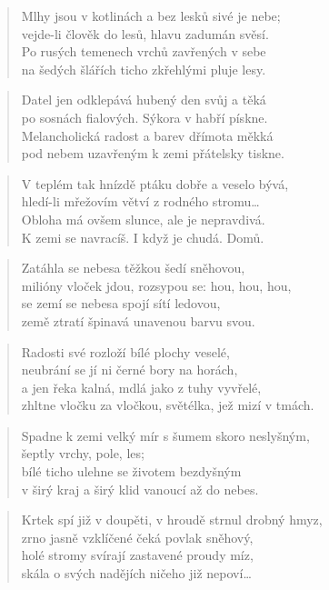 \documentclass{book}
\begin{document}
\newpage
{}
\begin{verse}
Mlhy jsou v kotlinách a bez lesků sivé je nebe;\\
vejde-li člověk do lesů, hlavu zadumán svěsí.\\
Po rusých temenech vrchů zavřených v sebe\\
na šedých šlářích ticho zkřehlými pluje lesy.
\end{verse}
\begin{verse}
Datel jen odklepává hubený den svůj a těká\\
po sosnách fialových. Sýkora v habří pískne.\\
Melancholická radost a barev dřímota měkká\\
pod nebem uzavřeným k zemi přátelsky tiskne.
\end{verse}
\begin{verse}
V teplém tak hnízdě ptáku dobře a veselo bývá,\\
hledí-li mřežovím větví z rodného stromu\ldots\\
Obloha má ovšem slunce, ale je nepravdivá.\\
K zemi se navracíš. I když je chudá. Domů.
\end{verse}
\newpage
{}
\begin{verse}
Zatáhla se nebesa těžkou šedí sněhovou,\\
milióny vloček jdou, rozsypou se: hou, hou, hou,\\
se zemí se nebesa spojí sítí ledovou,\\
země ztratí špinavá unavenou barvu svou.
\end{verse}
\begin{verse}
Radosti své rozloží bílé plochy veselé,\\
neubrání se jí ni černé bory na horách,\\
a jen řeka kalná, mdlá jako z tuhy vyvřelé,\\
zhltne vločku za vločkou, světélka, jež mizí v tmách.
\end{verse}
\begin{verse}
Spadne k zemi velký mír s šumem skoro neslyšným,\\
 šeptly vrchy, pole, les;\\
bílé ticho ulehne se životem bezdyšným\\
v širý kraj a širý klid vanoucí až do nebes.
\end{verse}
\begin{verse}
Krtek spí již v doupěti, v hroudě strnul drobný hmyz,\\
zrno jasně vzklíčené čeká povlak sněhový,\\
holé stromy svírají zastavené proudy míz,\\
skála o svých nadějích ničeho již nepoví\ldots
\end{verse}
\end{document}
